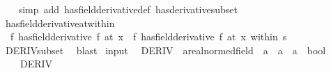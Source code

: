 \begin{isabellebody}
%
\isadelimproof
\ \ %
\endisadelimproof
%
\isatagproof
{}\isamarkupfalse%
\ {\isacharparenleft}{\kern0pt}simp\ add{\isacharcolon}{\kern0pt}\ has{\isacharunderscore}{\kern0pt}field{\isacharunderscore}{\kern0pt}derivative{\isacharunderscore}{\kern0pt}def\ has{\isacharunderscore}{\kern0pt}derivative{\isacharunderscore}{\kern0pt}subset{\isacharparenright}{\kern0pt}%
\endisatagproof
{\isafoldproof}%
%
\isadelimproof
\isanewline
%
\endisadelimproof
\isanewline
{}\isamarkupfalse%
\ has{\isacharunderscore}{\kern0pt}field{\isacharunderscore}{\kern0pt}derivative{\isacharunderscore}{\kern0pt}at{\isacharunderscore}{\kern0pt}within{\isacharcolon}{\kern0pt}\isanewline
\ \ {\isachardoublequoteopen}{\isacharparenleft}{\kern0pt}f\ has{\isacharunderscore}{\kern0pt}field{\isacharunderscore}{\kern0pt}derivative\ f{\isacharprime}{\kern0pt}{\isacharparenright}{\kern0pt}\ {\isacharparenleft}{\kern0pt}at\ x{\isacharparenright}{\kern0pt}\ {\isasymLongrightarrow}\ {\isacharparenleft}{\kern0pt}f\ has{\isacharunderscore}{\kern0pt}field{\isacharunderscore}{\kern0pt}derivative\ f{\isacharprime}{\kern0pt}{\isacharparenright}{\kern0pt}\ {\isacharparenleft}{\kern0pt}at\ x\ within\ s{\isacharparenright}{\kern0pt}{\isachardoublequoteclose}\isanewline
%
\isadelimproof
\ \ %
\endisadelimproof
%
\isatagproof
{}\isamarkupfalse%
\ DERIV{\isacharunderscore}{\kern0pt}subset\ \isamarkupfalse%
\ blast%
\endisatagproof
{\isafoldproof}%
%
\isadelimproof
\isanewline
%
\endisadelimproof
\isanewline
{}\isamarkupfalse%
\ {\isacharparenleft}{\kern0pt}input{\isacharparenright}{\kern0pt}\isanewline
\ \ DERIV\ {\isacharcolon}{\kern0pt}{\isacharcolon}{\kern0pt}\ {\isachardoublequoteopen}{\isacharparenleft}{\kern0pt}{\isacharprime}{\kern0pt}a{\isacharcolon}{\kern0pt}{\isacharcolon}{\kern0pt}real{\isacharunderscore}{\kern0pt}normed{\isacharunderscore}{\kern0pt}field\ {\isasymRightarrow}\ {\isacharprime}{\kern0pt}a{\isacharparenright}{\kern0pt}\ {\isasymRightarrow}\ {\isacharprime}{\kern0pt}a\ {\isasymRightarrow}\ {\isacharprime}{\kern0pt}a\ {\isasymRightarrow}\ bool{\isachardoublequoteclose}\isanewline
\ \ \ \ {\isacharparenleft}{\kern0pt}{\isachardoublequoteopen}{\isacharparenleft}{\kern0pt}DERIV\ {\isacharparenleft}{\kern0pt}{\isacharunderscore}{\kern0pt}{\isacharparenright}{\kern0pt}{\isacharslash}{\kern0pt}\ {\isacharparenleft}{\kern0pt}{\isacharunderscore}{\kern0pt}{\isacharparenright}{\kern0pt}{\isacharslash}{\kern0pt}\ {\isacharcolon}{\kern0pt}{\isachargreater}{\kern0pt}\ {\isacharparenleft}{\kern0pt}{\isacharunderscore}{\kern0pt}{\isacharparenright}{\kern0pt}{\isacharparenright}{\kern0pt}{\isachardoublequoteclose}\ {\isacharbrackleft}{\kern0pt}{}{}{}{}{\isacharcomma}{\kern0pt}\ {}{}{}{}{\isacharcomma}{\kern0pt}\ {}{}{\isacharbrackright}{\kern0pt}\ {}{}{\isacharparenright}{\kern0pt}\isanewline

\end{isabellebody}
